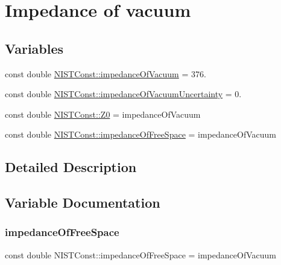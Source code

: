 \hypertarget{group___impedance_of_vacuum}{}\section{Impedance of vacuum}
\label{group___impedance_of_vacuum}
\subsection*{Variables}
\begin{DoxyCompactItemize}
\item 
const double \hyperlink{group___impedance_of_vacuum_ga51e1aede5d89041ea7423522b526dd0e}{N\+I\+S\+T\+Const\+::impedance\+Of\+Vacuum} = 376.
\item 
const double \hyperlink{group___impedance_of_vacuum_ga0d686b0016dc8c1f0bda161283b4f9c5}{N\+I\+S\+T\+Const\+::impedance\+Of\+Vacuum\+Uncertainty} = 0.
\item 
const double \hyperlink{group___impedance_of_vacuum_ga0de5c47b3a38d72c61aac5574ea154ca}{N\+I\+S\+T\+Const\+::\+Z0} = impedance\+Of\+Vacuum
\item 
const double \hyperlink{group___impedance_of_vacuum_ga299cd5a5d3a7df43dd6b8c8335bbc8c6}{N\+I\+S\+T\+Const\+::impedance\+Of\+Free\+Space} = impedance\+Of\+Vacuum
\end{DoxyCompactItemize}


\subsection{Detailed Description}


\subsection{Variable Documentation}
\mbox{\label{group___impedance_of_vacuum_ga299cd5a5d3a7df43dd6b8c8335bbc8c6}} 
\subsubsection{\texorpdfstring{impedance\+Of\+Free\+Space}{impedanceOfFreeSpace}}
{\footnotesize\ttfamily const double N\+I\+S\+T\+Const\+::impedance\+Of\+Free\+Space = impedance\+Of\+Vacuum}

